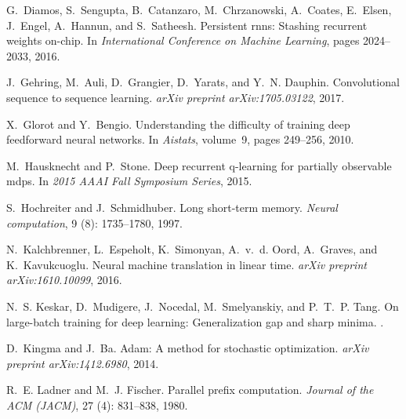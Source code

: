 \documentclass{article}
\begin{document}
\begin{thebibliography}{19}
G.~Diamos, S.~Sengupta, B.~Catanzaro, M.~Chrzanowski, A.~Coates, E.~Elsen,
  J.~Engel, A.~Hannun, and S.~Satheesh.
\newblock Persistent rnns: Stashing recurrent weights on-chip.
\newblock In \emph{International Conference on Machine Learning}, pages
  2024--2033, 2016.

J.~Gehring, M.~Auli, D.~Grangier, D.~Yarats, and Y.~N. Dauphin.
\newblock Convolutional sequence to sequence learning.
\newblock \emph{arXiv preprint arXiv:1705.03122}, 2017.

X.~Glorot and Y.~Bengio.
\newblock Understanding the difficulty of training deep feedforward neural
  networks.
\newblock In \emph{Aistats}, volume~9, pages 249--256, 2010.

M.~Hausknecht and P.~Stone.
\newblock Deep recurrent q-learning for partially observable mdps.
\newblock In \emph{2015 AAAI Fall Symposium Series}, 2015.

S.~Hochreiter and J.~Schmidhuber.
\newblock Long short-term memory.
\newblock \emph{Neural computation}, 9 (8): 1735--1780, 1997.

N.~Kalchbrenner, L.~Espeholt, K.~Simonyan, A.~v.~d. Oord, A.~Graves, and
  K.~Kavukcuoglu.
\newblock Neural machine translation in linear time.
\newblock \emph{arXiv preprint arXiv:1610.10099}, 2016.

N.~S. Keskar, D.~Mudigere, J.~Nocedal, M.~Smelyanskiy, and P.~T.~P. Tang.
\newblock On large-batch training for deep learning: Generalization gap and
  sharp minima.
.

D.~Kingma and J.~Ba.
\newblock Adam: A method for stochastic optimization.
\newblock \emph{arXiv preprint arXiv:1412.6980}, 2014.

R.~E. Ladner and M.~J. Fischer.
\newblock Parallel prefix computation.
\newblock \emph{Journal of the ACM (JACM)}, 27 (4): 831--838,
  1980.


\end{thebibliography}
\end{document}
